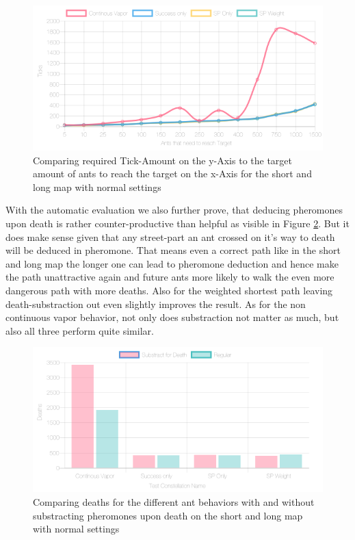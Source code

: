 \begin{figure}[H]
  \centering
  \includegraphics[width=1\linewidth]{images/normalshortandlongwithtowers-ticks-line}
  \caption{Comparing required Tick-Amount on the y-Axis to the target amount of ants to reach the target on the x-Axis for the short and long map with normal settings}
  \label{fig:shortlongvaptick}
\end{figure}

With the automatic evaluation we also further prove, that deducing pheromones upon death is rather counter-productive than helpful as visible in Figure \ref{fig:deathsubshitty}. But it does make sense given that any street-part an ant crossed on it's way to death will be deduced in pheromone. That means even a correct path like in the short and long map the longer one can lead to pheromone deduction and hence make the path unattractive again and future ants more likely to walk the even more dangerous path with more deaths.
Also for the weighted shortest path leaving death-substraction out even slightly improves the result. As for the non continuous vapor behavior, not only does substraction not matter as much, but also all three perform quite similar.


\begin{figure}[H]
  \centering
  \includegraphics[width=1\linewidth]{images/normalshortandlongwithtowers-deaths}
  \caption{Comparing deaths for the different ant behaviors with and without substracting pheromones upon death on the short and long map with normal settings}
  \label{fig:deathsubshitty}
\end{figure}

